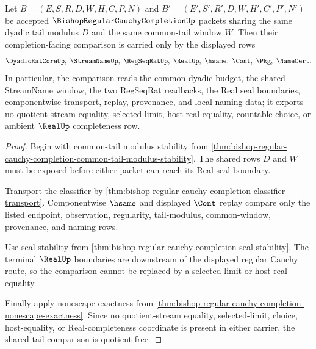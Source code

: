\begin{theorem}
\label{thm:bishop-regular-cauchy-completion-tail-equivalence-quotient-free}
Let $B=(E,S,R,D,W,H,C,P,N)$ and $B'=(E',S',R',D,W,H',C',P',N')$ be accepted $\BishopRegularCauchyCompletionUp$ packets sharing the same dyadic tail modulus $D$ and the same common-tail window $W$. Then their completion-facing comparison is carried only by the displayed rows
$$
\DyadicRatCoreUp,\ \StreamNameUp,\ \RegSeqRatUp,\ \RealUp,\ \hsame,\ \Cont,\ \Pkg,\ \NameCert .
$$
In particular, the comparison reads the common dyadic budget, the shared StreamName window, the two RegSeqRat readbacks, the Real seal boundaries, componentwise transport, replay, provenance, and local naming data; it exports no quotient-stream equality, selected limit, host real equality, countable choice, or ambient $\RealUp$ completeness row.
\end{theorem}
\begin{proof}
Begin with common-tail modulus stability from \autoref{thm:bishop-regular-cauchy-completion-common-tail-modulus-stability}. The shared rows $D$ and $W$ must be exposed before either packet can reach its Real seal boundary.

Transport the classifier by \autoref{thm:bishop-regular-cauchy-completion-classifier-transport}. Componentwise $\hsame$ and displayed $\Cont$ replay compare only the listed endpoint, observation, regularity, tail-modulus, common-window, provenance, and naming rows.

Use seal stability from \autoref{thm:bishop-regular-cauchy-completion-seal-stability}. The terminal $\RealUp$ boundaries are downstream of the displayed regular Cauchy route, so the comparison cannot be replaced by a selected limit or host real equality.

Finally apply nonescape exactness from \autoref{thm:bishop-regular-cauchy-completion-nonescape-exactness}. Since no quotient-stream equality, selected-limit, choice, host-equality, or Real-completeness coordinate is present in either carrier, the shared-tail comparison is quotient-free.
\end{proof}

